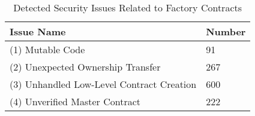 \begin{table}[htbp]
  \centering
  \footnotesize
  \caption{Detected Security Issues Related to Factory Contracts}
  \label{tab:security}
  \begin{tabularx}{0.6\linewidth}{@{}lR@{}}
    \toprule
    \textbf{Issue Name}                     & \textbf{Number} \\
    \midrule
    (1) Mutable Code                   & 91     \\
    (2) Unexpected Ownership Transfer & 267    \\
    (3) Unhandled Low-Level Contract Creation & 600    \\
    (4) Unverified Master Contract       & 222    \\
    \bottomrule
  \end{tabularx}
\end{table}
